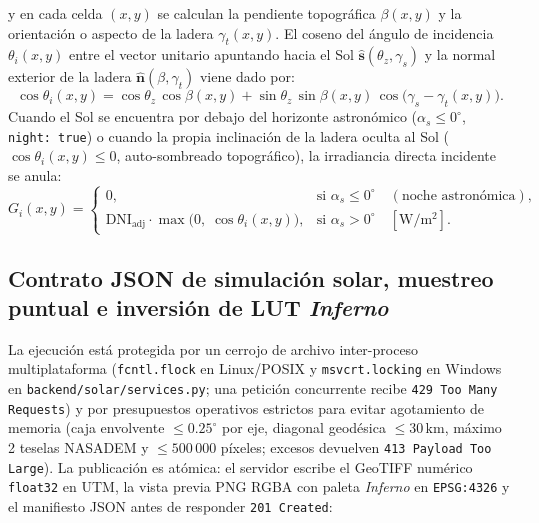 \documentclass[11pt,a4paper]{article}
\newcommand{\src}[1]{\nolinkurl{#1}}
\newcommand{\unit}[1]{\mathrm{#1}}
\begin{document}
\begin{enumerate}
        y en cada celda $(x,y)$ se calculan la pendiente topográfica $\beta(x,y)$ y la orientación o aspecto de
        la ladera $\gamma_t(x,y)$. El coseno del ángulo de incidencia $\theta_i(x,y)$ entre el vector unitario
        apuntando hacia el Sol $\hat{\mathbf{s}}(\theta_z, \gamma_s)$ y la normal exterior de la ladera
        $\hat{\mathbf{n}}(\beta, \gamma_t)$ viene dado por:
        \begin{equation}
          \cos\theta_i(x,y) = \cos\theta_z\,\cos\beta(x,y)
          + \sin\theta_z\,\sin\beta(x,y)\,\cos\!\bigl(\gamma_s - \gamma_t(x,y)\bigr).
          \label{eq:solar-cos-incidencia}
        \end{equation}
        Cuando el Sol se encuentra por debajo del horizonte astronómico ($\alpha_s \le 0^\circ$,
        \texttt{night: true}) o cuando la propia inclinación de la ladera oculta al Sol ($\cos\theta_i(x,y) \le 0$,
        auto-sombreado topográfico), la irradiancia directa incidente se anula:
        \begin{equation}
          G_i(x,y) =
          \begin{cases}
            0, & \text{si } \alpha_s \le 0^\circ \quad (\text{noche astronómica}), \\[4pt]
            \mathrm{DNI}_{\mathrm{adj}} \cdot \max\!\bigl(0,\; \cos\theta_i(x,y)\bigr), & \text{si } \alpha_s > 0^\circ
            \quad [\unit{W/m^2}].
          \end{cases}
          \label{eq:solar-gi-incidente}
        \end{equation}
\end{enumerate}

\subsection{Contrato JSON de simulación solar, muestreo puntual e inversión de LUT \emph{Inferno}}

La ejecución está protegida por un cerrojo de archivo inter-proceso multiplataforma (\texttt{fcntl.flock} en
Linux/POSIX y \texttt{msvcrt.locking} en Windows en \src{backend/solar/services.py}; una petición concurrente
recibe \texttt{429 Too Many Requests}) y por presupuestos operativos estrictos para evitar agotamiento de memoria
(caja envolvente $\le 0.25^\circ$ por eje, diagonal geodésica $\le 30\,\unit{km}$, máximo 2 teselas NASADEM y
$\le 500\,000$ píxeles; excesos devuelven \texttt{413 Payload Too Large}). La publicación es atómica: el servidor
escribe el GeoTIFF numérico \texttt{float32} en UTM, la vista previa PNG RGBA con paleta \emph{Inferno} en
\texttt{EPSG:4326} y el manifiesto JSON antes de responder \texttt{201 Created}:
\end{document}
